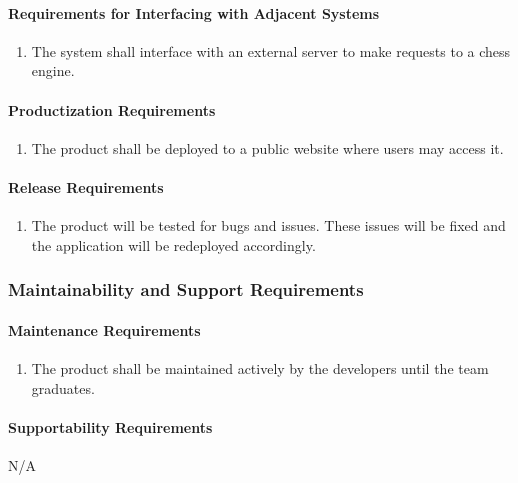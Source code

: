 \documentclass[12pt]{article}
\begin{document}
\paragraph{Requirements for Interfacing with Adjacent Systems}
\begin{enumerate}[{OE}1., leftmargin=2\parindent, resume]
    \item The system shall interface with an external server to make requests to a chess engine.
\end{enumerate}

\paragraph{Productization Requirements}
\begin{enumerate}[{OE}1., leftmargin=2\parindent, resume]
    \item The product shall be deployed to a public website where users may access it.
\end{enumerate}

\paragraph{Release Requirements}
\begin{enumerate}[{OE}1., leftmargin=2\parindent, resume]
    \item The product will be tested for bugs and issues. These issues will be fixed and the application will be redeployed accordingly.
\end{enumerate}



\subsubsection{Maintainability and Support Requirements}
\label{NFR_MS}
\paragraph{Maintenance Requirements}
\begin{enumerate}[{MS}1., leftmargin=2\parindent]
    \item The product shall be maintained actively by the developers until the \progname{} team graduates.
\end{enumerate}

\paragraph{Supportability Requirements}
N/A
\end{document}
